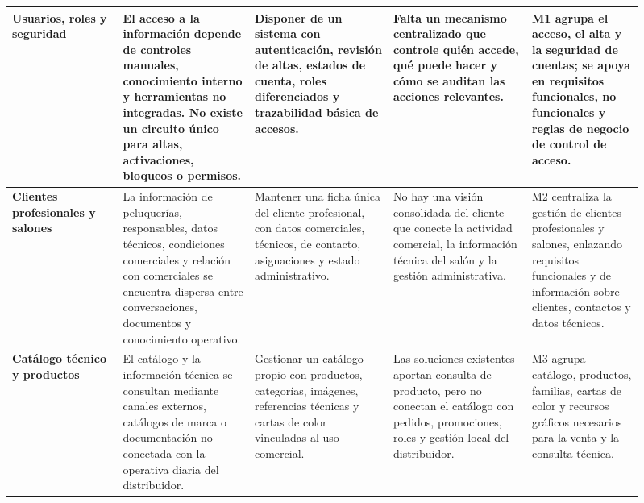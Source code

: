 {\scriptsize
\setlength{\parskip}{0pt}
\setlength{\tabcolsep}{2.5pt}
\renewcommand{\arraystretch}{1.04}

\begin{supertabular}{|>{\raggedright\arraybackslash}p{0.16\linewidth}|>{\raggedright\arraybackslash}p{0.19\linewidth}|>{\raggedright\arraybackslash}p{0.20\linewidth}|>{\raggedright\arraybackslash}p{0.20\linewidth}|>{\raggedright\arraybackslash}p{0.16\linewidth}|}

\textbf{Usuarios, roles y seguridad} & El acceso a la información depende de controles manuales, conocimiento interno y herramientas no integradas. No existe un circuito único para altas, activaciones, bloqueos o permisos. & Disponer de un sistema con \textbf{autenticación}, revisión de altas, estados de cuenta, roles diferenciados y trazabilidad básica de accesos. & Falta un mecanismo centralizado que controle quién accede, qué puede hacer y cómo se auditan las acciones relevantes. & M1 agrupa el acceso, el alta y la seguridad de cuentas; se apoya en requisitos funcionales, no funcionales y reglas de negocio de control de acceso. \\
\hline

\textbf{Clientes profesionales y salones} & La información de peluquerías, responsables, datos técnicos, condiciones comerciales y relación con comerciales se encuentra dispersa entre conversaciones, documentos y conocimiento operativo. & Mantener una ficha única del cliente profesional, con datos comerciales, técnicos, de contacto, asignaciones y estado administrativo. & No hay una visión consolidada del cliente que conecte la actividad comercial, la información técnica del salón y la gestión administrativa. & M2 centraliza la gestión de clientes profesionales y salones, enlazando requisitos funcionales y de información sobre clientes, contactos y datos técnicos. \\
\hline

\textbf{Catálogo técnico y productos} & El catálogo y la información técnica se consultan mediante canales externos, catálogos de marca o documentación no conectada con la operativa diaria del distribuidor. & Gestionar un catálogo propio con productos, categorías, imágenes, referencias técnicas y cartas de color vinculadas al uso comercial. & Las soluciones existentes aportan consulta de producto, pero no conectan el catálogo con pedidos, promociones, roles y gestión local del distribuidor. & M3 agrupa catálogo, productos, familias, cartas de color y recursos gráficos necesarios para la venta y la consulta técnica. \\
\hline


\end{supertabular}}
